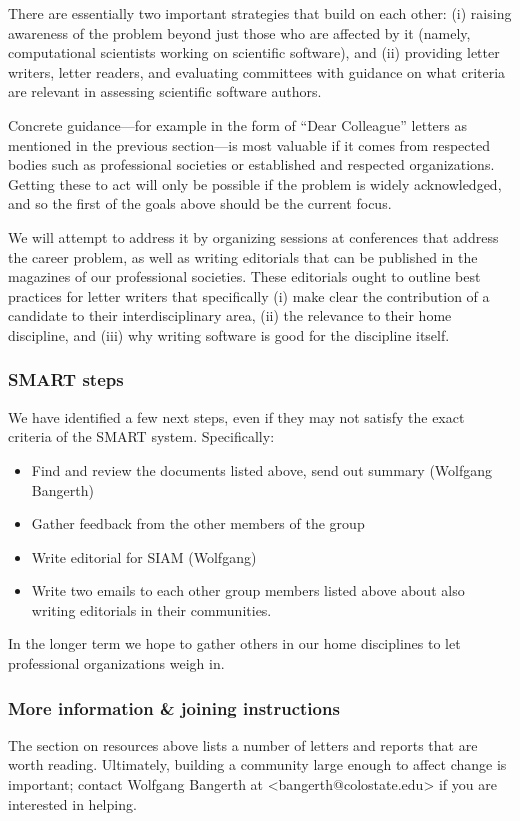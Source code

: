 There are essentially two important strategies that build on each
other: (i) raising awareness of the problem beyond just those who are
affected by it (namely, computational scientists working on scientific
software), and (ii) providing letter writers, letter readers, and
evaluating committees with guidance on what criteria are relevant in
assessing scientific software authors.

Concrete guidance---for example in the form of ``Dear Colleague''
letters as mentioned in the previous section---is most valuable if it
comes from respected bodies such as professional societies or
established and respected organizations. Getting these to act
will only be possible if the problem is widely acknowledged, and so
the first of the goals above should be the current focus.

We will attempt to address it by organizing sessions at conferences
that address the career problem, as well as writing editorials that
can be published in the magazines of our professional societies. These
editorials ought to outline best practices for letter writers that
specifically (i) make clear the contribution of a candidate to their
interdisciplinary area, (ii) the relevance to their home discipline, and
(iii) why writing software is good for the discipline itself.


\subsubsection{SMART steps}

We have identified a few next steps, even if they may not satisfy the
exact criteria of the SMART system. Specifically:
\begin{itemize}
  \item Find and review the documents listed above, send out summary
    (Wolfgang Bangerth)
  \item Gather feedback from the other members of the group
  \item Write editorial for SIAM (Wolfgang)
  \item Write two emails to each other group members listed above about
    also writing editorials in their communities.
\end{itemize}
In the longer term we hope to gather others in our home disciplines to
let professional organizations weigh in.


\subsubsection{More information \& joining instructions}

The section on resources above lists a number of letters and reports
that are worth reading. Ultimately, building a community large enough
to affect change is important; contact Wolfgang Bangerth at
<bangerth@colostate.edu> if you are interested in helping.
